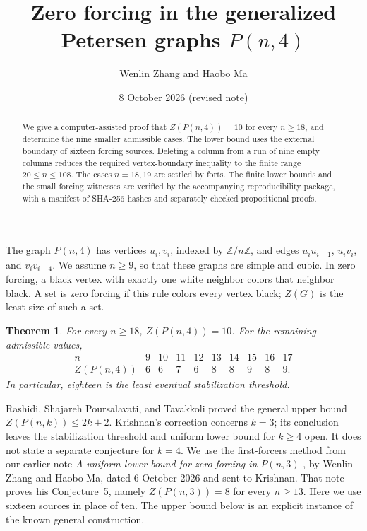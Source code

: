 \documentclass[10pt,a4paper]{article}
\title{Zero forcing in the generalized Petersen graphs $P(n,4)$}
\author{Wenlin Zhang and Haobo Ma}
\date{8 October 2026 (revised note)}
\newtheorem{theorem}{Theorem}
\newcommand{\ZF}{Z}
\begin{document}
\maketitle
\begin{abstract}
We give a computer-assisted proof that $\ZF(P(n,4))=10$ for every
$n\ge18$, and determine the nine smaller admissible cases. The lower bound
uses the external boundary of sixteen forcing sources. Deleting a column
from a run of nine empty columns reduces the required vertex-boundary
inequality to the finite range $20\le n\le108$. The cases $n=18,19$ are
settled by forts. The finite lower bounds and the small forcing witnesses are verified by
the accompanying reproducibility package, with a manifest of SHA-256 hashes
and separately checked propositional proofs.
\end{abstract}

The graph $P(n,4)$ has vertices $u_i,v_i$, indexed by $\mathbb Z/n\mathbb Z$,
and edges $u_i u_{i+1}$, $u_i v_i$, and $v_i v_{i+4}$. We assume $n\ge9$,
so that these graphs are simple and cubic. In zero forcing, a black vertex
with exactly one white neighbor colors that neighbor black. A set is zero
forcing if this rule colors every vertex black; $\ZF(G)$ is the least size
of such a set.

\begin{theorem}\label{main}
For every $n\ge18$, $\ZF(P(n,4))=10$. For the remaining admissible values,
\[
\begin{array}{c|rrrrrrrrr}
n&9&10&11&12&13&14&15&16&17\\\hline
\ZF(P(n,4))&6&6&7&6&8&8&9&8&9.
\end{array}
\]
In particular, eighteen is the least eventual stabilization threshold.
\end{theorem}

Rashidi, Shajareh Poursalavati, and Tavakkoli \cite[Theorem 2.2]{RSPT}
proved the general upper bound $\ZF(P(n,k))\le2k+2$. Krishnan's correction
\cite{Krishnan} concerns $k=3$; its conclusion leaves the stabilization
threshold and uniform lower bound for $k\ge4$ open. It does not state a
separate conjecture for $k=4$. We use the first-forcers method from our earlier note
\emph{A uniform lower bound for zero forcing in $P(n,3)$} \cite{ZM},
by Wenlin Zhang and Haobo Ma, dated 6 October 2026 and sent to Krishnan.
That note proves his Conjecture~5, namely $\ZF(P(n,3))=8$ for every
$n\ge13$. Here we use sixteen sources in place of ten. The upper bound below is an explicit instance of the known
general construction.
\end{document}
